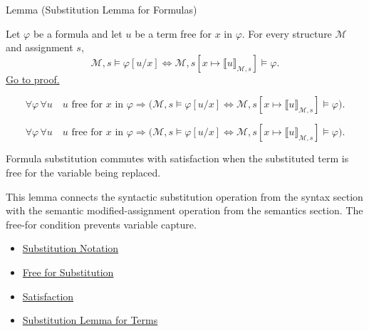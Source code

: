 \begin{lemmabox}{Lemma (Substitution Lemma for Formulas)}
\begin{lemma}
\label{lem:subst-formulas}
Let \(\varphi\) be a formula and let \(u\) be a term free for \(x\) in
\(\varphi\). For every structure \(\mathcal M\) and assignment \(s\),
\[
\mathcal M,s\models\varphi[u/x]
\Longleftrightarrow
\mathcal M,s[x\mapsto\llbracket u\rrbracket_{\mathcal M,s}]\models\varphi.
\]
\hyperref[prf:subst-formulas]{Go to proof.}
\end{lemma}
\end{lemmabox}

\begin{remark*}
\[
\forall \varphi\,\forall u\quad
u \text{ free for } x \text{ in } \varphi
\Rightarrow
\bigl(
\mathcal M,s\models\varphi[u/x]
\Longleftrightarrow
\mathcal M,s[x\mapsto\llbracket u\rrbracket_{\mathcal M,s}]\models\varphi
\bigr).
\]
\end{remark*}

\begin{remark*}
\[
\forall \varphi\,\forall u\quad
u \text{ free for } x \text{ in } \varphi
\Rightarrow
\bigl(
\mathcal M,s\models\varphi[u/x]
\Longleftrightarrow
\mathcal M,s[x\mapsto\llbracket u\rrbracket_{\mathcal M,s}]\models\varphi
\bigr).
\]
\end{remark*}



\begin{remark*}[Interpretation]
Formula substitution commutes with satisfaction when the substituted term is
free for the variable being replaced.

This lemma connects the syntactic substitution operation from the syntax
section with the semantic modified-assignment operation from the semantics
section. The free-for condition prevents variable capture.
\end{remark*}

\begin{dependencies}
\begin{itemize}
  \item \hyperref[def:subst-notation]{Substitution Notation}
  \item \hyperref[def:free-for]{Free for Substitution}
  \item \hyperref[def:fol-satisfaction]{Satisfaction}
  \item \hyperref[lem:subst-terms]{Substitution Lemma for Terms}
\end{itemize}
\end{dependencies}
